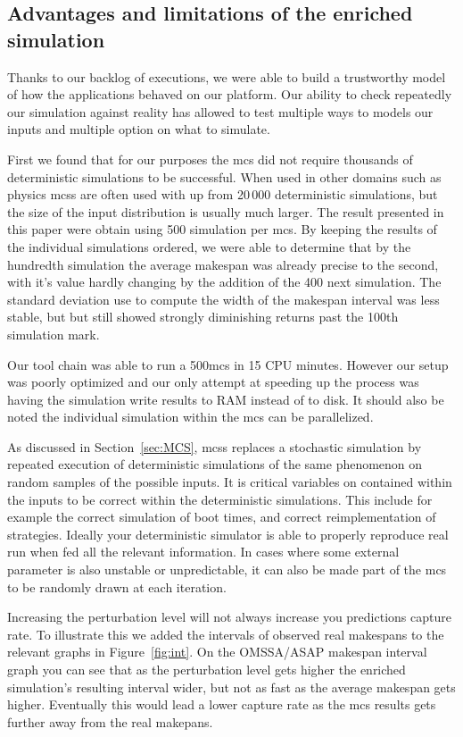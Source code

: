 \documentclass[10pt,conference,compsocconf]{IEEEtran}
\begin{document}
\subsection{Advantages and limitations of the enriched simulation}\label{sec:lim}

Thanks to our backlog of executions, we were able to build a trustworthy model
of how the applications behaved on our platform. Our ability to check repeatedly
our simulation against reality has allowed to test multiple ways to models our
inputs and multiple option on what to simulate. 

First we found that for our purposes the \ac{mcs} did not require thousands of
deterministic simulations to be successful. When used in other domains such as
physics \acp{mcs} are often used with up from 20\,000 deterministic simulations,
but the size of the input distribution is usually much larger. The result
presented in this paper were obtain using 500 simulation per \ac{mcs}. By
keeping the results of the individual simulations ordered, we were able to
determine that by the hundredth simulation the average makespan was already
precise to the second, with it's value hardly changing by the addition of the
400 next simulation. The standard deviation use to compute the width of the
makespan interval was less stable, but but still showed strongly diminishing
returns past the 100th simulation mark.

Our tool chain was able to run a 500\ac{mcs} in 15 CPU minutes. However our
setup was poorly optimized and our only attempt at speeding up the process was
having the simulation write results to RAM instead of to disk. It should also be
noted the individual simulation within the \ac{mcs} can be parallelized.

As discussed in Section~\ref{sec:MCS}, \aclp{mcs} replaces a stochastic
simulation by repeated execution of deterministic simulations of the same
phenomenon on random samples of the possible inputs. It is critical variables on
contained within the inputs to be correct within the deterministic simulations.
This include for example the correct simulation of boot times, and correct
reimplementation of strategies. Ideally your deterministic simulator is able to
properly reproduce real run when fed all the relevant information. In cases
where some external parameter is also unstable or unpredictable, it can also be
made part of the \ac{mcs} to be randomly drawn at each iteration.

Increasing the perturbation level will not always increase you predictions
capture rate. To illustrate this we added the intervals of observed real
makespans to the relevant graphs in Figure~\ref{fig:int}. On the OMSSA/ASAP
makespan interval graph you can see that as the perturbation level gets higher
the enriched simulation's resulting interval wider, but not as fast as the
average makespan gets higher. Eventually this would lead a lower capture rate as
the \ac{mcs} results gets further away from the real makepans. 
\end{document}
